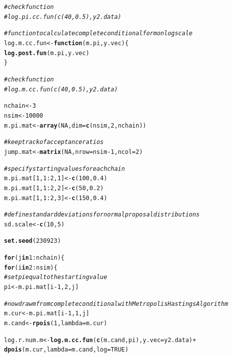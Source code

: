 \documentclass[12pt]{article}\usepackage[]{graphicx}\usepackage[]{color}
\makeatletter
\newcommand{\hlnum}[1]{\textcolor[rgb]{0.686,0.059,0.569}{#1}}%
\newcommand{\hlcom}[1]{\textcolor[rgb]{0.678,0.584,0.686}{\textit{#1}}}%
\newcommand{\hlopt}[1]{\textcolor[rgb]{0,0,0}{#1}}%
\newcommand{\hlstd}[1]{\textcolor[rgb]{0.345,0.345,0.345}{#1}}%
\newcommand{\hlkwa}[1]{\textcolor[rgb]{0.161,0.373,0.58}{\textbf{#1}}}%
\newcommand{\hlkwb}[1]{\textcolor[rgb]{0.69,0.353,0.396}{#1}}%
\newcommand{\hlkwc}[1]{\textcolor[rgb]{0.333,0.667,0.333}{#1}}%
\newcommand{\hlkwd}[1]{\textcolor[rgb]{0.737,0.353,0.396}{\textbf{#1}}}%
\newenvironment{kframe}{%
 \def\at@end@of@kframe{}%
 \ifinner\ifhmode%
  \def\at@end@of@kframe{\end{minipage}}%
  \begin{minipage}{\columnwidth}%
 \fi\fi%
 \def\FrameCommand##1{\hskip\@totalleftmargin \hskip-\fboxsep
 \colorbox{shadecolor}{##1}\hskip-\fboxsep
     \hskip-\linewidth \hskip-\@totalleftmargin \hskip\columnwidth}%
 \MakeFramed {\advance\hsize-\width
   \@totalleftmargin\z@ \linewidth\hsize
   \@setminipage}}%
 {\par\unskip\endMakeFramed%
 \at@end@of@kframe}
\newenvironment{knitrout}{}{} %
\makeatother
\begin{document}
\begin{enumerate}
\begin{enumerate}
\begin{enumerate}
\begin{knitrout}
\begin{kframe}
\begin{alltt}
\hlcom{#check function}
\hlcom{#log.pi.cc.fun(c(40, 0.5), y2.data)}

\hlcom{#function to calculate complete conditional for m on log scale}
\hlstd{log.m.cc.fun} \hlkwb{<-} \hlkwa{function}\hlstd{(}\hlkwc{m.pi}\hlstd{,} \hlkwc{y.vec}\hlstd{)\{}
  \hlkwd{log.post.fun}\hlstd{(m.pi, y.vec)}
\hlstd{\}}

\hlcom{#check function}
\hlcom{#log.m.cc.fun(c(40, 0.5), y2.data)}

\hlstd{nchain} \hlkwb{<-} \hlnum{3}
\hlstd{nsim} \hlkwb{<-} \hlnum{10000}
\hlstd{m.pi.mat} \hlkwb{<-} \hlkwd{array}\hlstd{(}\hlnum{NA}\hlstd{,} \hlkwc{dim}\hlstd{=}\hlkwd{c}\hlstd{(nsim,} \hlnum{2}\hlstd{, nchain))}

\hlcom{#keep track of acceptance ratios}
\hlstd{jump.mat} \hlkwb{<-} \hlkwd{matrix}\hlstd{(}\hlnum{NA}\hlstd{,} \hlkwc{nrow}\hlstd{=nsim}\hlopt{-}\hlnum{1}\hlstd{,} \hlkwc{ncol}\hlstd{=}\hlnum{2}\hlstd{)}

\hlcom{#specify starting values for each chain}
\hlstd{m.pi.mat[}\hlnum{1}\hlstd{,} \hlnum{1}\hlopt{:}\hlnum{2}\hlstd{,} \hlnum{1}\hlstd{]} \hlkwb{<-} \hlkwd{c}\hlstd{(}\hlnum{100}\hlstd{,} \hlnum{0.4}\hlstd{)}
\hlstd{m.pi.mat[}\hlnum{1}\hlstd{,} \hlnum{1}\hlopt{:}\hlnum{2}\hlstd{,} \hlnum{2}\hlstd{]} \hlkwb{<-} \hlkwd{c}\hlstd{(}\hlnum{50}\hlstd{,} \hlnum{0.2}\hlstd{)}
\hlstd{m.pi.mat[}\hlnum{1}\hlstd{,} \hlnum{1}\hlopt{:}\hlnum{2}\hlstd{,} \hlnum{3}\hlstd{]} \hlkwb{<-} \hlkwd{c}\hlstd{(}\hlnum{150}\hlstd{,} \hlnum{0.4}\hlstd{)}

\hlcom{#define standard deviations for normal proposal distributions}
\hlstd{sd.scale} \hlkwb{<-} \hlkwd{c}\hlstd{(}\hlnum{10}\hlstd{,} \hlnum{5}\hlstd{)}

\hlkwd{set.seed}\hlstd{(}\hlnum{230923}\hlstd{)}

\hlkwa{for} \hlstd{(j} \hlkwa{in} \hlnum{1}\hlopt{:}\hlstd{nchain) \{}
  \hlkwa{for} \hlstd{(i} \hlkwa{in} \hlnum{2}\hlopt{:}\hlstd{nsim) \{}
    \hlcom{#set pi equal to the starting value}
    \hlstd{pi} \hlkwb{<-} \hlstd{m.pi.mat[i}\hlopt{-}\hlnum{1}\hlstd{,} \hlnum{2}\hlstd{, j]}

    \hlcom{#now draw m from complete conditional with Metropolis Hastings Algorithm}
    \hlstd{m.cur} \hlkwb{<-} \hlstd{m.pi.mat[i}\hlopt{-}\hlnum{1}\hlstd{,} \hlnum{1}\hlstd{, j]}
    \hlstd{m.cand} \hlkwb{<-} \hlkwd{rpois}\hlstd{(}\hlnum{1}\hlstd{,} \hlkwc{lambda}\hlstd{=m.cur)}

    \hlstd{log.r.num.m} \hlkwb{<-} \hlkwd{log.m.cc.fun}\hlstd{(}\hlkwd{c}\hlstd{(m.cand, pi),} \hlkwc{y.vec} \hlstd{= y2.data)} \hlopt{+}
                     \hlkwd{dpois}\hlstd{(m.cur,} \hlkwc{lambda}\hlstd{=m.cand,} \hlkwc{log} \hlstd{=} \hlnum{TRUE}\hlstd{)}


\end{alltt}
\end{kframe}
\end{knitrout}
\end{enumerate}
\end{enumerate}
\end{enumerate}
\end{document}
